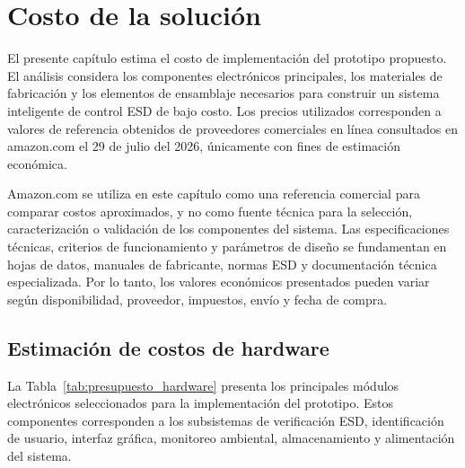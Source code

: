 \chapter{Costo de la solución}

El presente capítulo estima el costo de implementación del prototipo propuesto.
El análisis considera los componentes electrónicos principales, los materiales de
fabricación y los elementos de ensamblaje necesarios para construir un sistema
inteligente de control ESD de bajo costo. Los precios utilizados corresponden a
valores de referencia obtenidos de proveedores comerciales en línea consultados en
amazon.com el 29 de julio del 2026, únicamente con fines de estimación económica.

Amazon.com se utiliza en este capítulo como una referencia comercial para
comparar costos aproximados, y no como fuente técnica para la selección,
caracterización o validación de los componentes del sistema. Las especificaciones
técnicas, criterios de funcionamiento y parámetros de diseño se fundamentan en
hojas de datos, manuales de fabricante, normas ESD y documentación técnica
especializada. Por lo tanto, los valores económicos presentados pueden variar
según disponibilidad, proveedor, impuestos, envío y fecha de compra.

\section{Estimación de costos de hardware}

La Tabla~\ref{tab:presupuesto_hardware} presenta los principales módulos
electrónicos seleccionados para la implementación del prototipo. Estos
componentes corresponden a los subsistemas de verificación ESD, identificación
de usuario, interfaz gráfica, monitoreo ambiental, almacenamiento y alimentación
del sistema.

